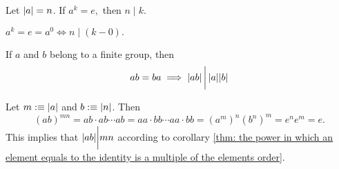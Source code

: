 \begin{corollary}
  \label{thm: the power in which an element equals to the identity is a multiple of the elements order}
  Let $\abs{a}= n$. If $a^k = e,$ then $n \mid k$.
\end{corollary}
\begin{prf}
  $a^k=e=a^0 \iff n \mid (k-0).$
\end{prf}

\begin{corollary}
  If $a$ and $b$ belong to a finite group, then
\begin{equation}
    ab = ba \implies \abs{ab} \,\bigg|\, \abs{a} \abs{b}
\end{equation}

\end{corollary}
\begin{prf}
  Let $m :\equiv \abs{a}$ and $b:\equiv \abs{n}$. Then
  \begin{equation}
    (ab)^{mn} = ab\cdot ab\cdots ab= aa \cdot bb \cdots aa \cdot bb =(a^m)^n (b^n)^m = e^ne^m = e.
  \end{equation}
  This implies that $\abs{ab} \bigg | mn$ according to corollary \ref{thm: the power in which an element equals to the identity is a multiple of the elements order}.
\end{prf}

